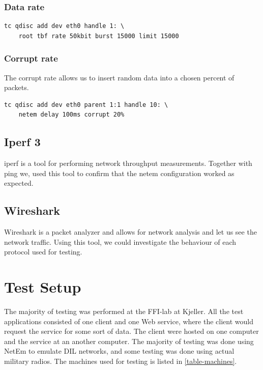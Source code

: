 \subsubsection{Data rate}

\begin{lstlisting}[frame=single, caption="Emulating delay", label=listing-netem-data-rate]
  tc qdisc add dev eth0 handle 1: \
    root tbf rate 50kbit burst 15000 limit 15000
\end{lstlisting}

\subsubsection{Corrupt rate}

The corrupt rate allows us to insert random data into a chosen percent of
packets.

\begin{lstlisting}[frame=single, caption="Emulating delay", label=listing-netem-error-rate]
  tc qdisc add dev eth0 parent 1:1 handle 10: \
    netem delay 100ms corrupt 20%
\end{lstlisting}


\subsection{Iperf 3}

iperf is a tool for performing network throughput measurements. Together with
ping we, used this tool to confirm that the \gls{netem} configuration worked as
expected.

\subsection{Wireshark}

Wireshark is a packet analyzer and allows for network analysis and let us see
the network traffic. Using this tool, we could investigate the behaviour of each
protocol used for testing.



\section{Test Setup}
\label{testing-environment}

The majority of testing was performed at the FFI-lab at Kjeller. All the test
applications consisted of one client and one Web service, where the client would
request the service for some sort of data. The client were hosted on one
computer and the service at an another computer. The majority of testing was
done using NetEm to emulate DIL networks, and some testing was done using actual
military radios. The machines used for testing is listed in
\cref{table-machines}.

